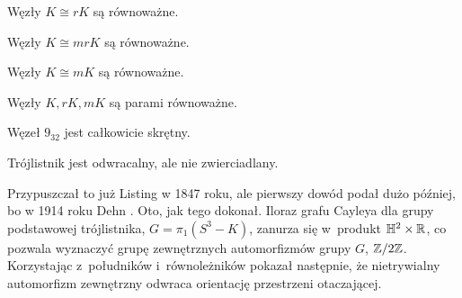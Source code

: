 \begin{definition}[odwracalny]
    Węzły $K \cong rK$ są równoważne. %
\end{definition}

\begin{definition}
    Węzły $K \cong mrK$ są równoważne. %
\end{definition}

\begin{definition}
    Węzły $K \cong mK$ są równoważne. %
\end{definition}

\begin{definition}
    Węzły $K, rK, mK$ są parami równoważne. %
\end{definition}

\begin{example}
    Węzeł $9_{32}$ jest całkowicie skrętny.
\end{example}


\begin{example}
    \label{exm:trefoil_is_chiral}
    Trójlistnik jest odwracalny, ale nie zwierciadlany.
\end{example}

Przypuszczał to już Listing \cite{listing1847} w 1847 roku, ale pierwszy dowód podał dużo później, bo w 1914 roku Dehn \cite{dehn1914}. 
Oto, jak tego dokonał.
Iloraz grafu Cayleya dla grupy podstawowej trójlistnika, $G = \pi_1(S^3 - K)$, zanurza się w~produkt $\mathbb H^2 \times \mathbb R$, co pozwala wyznaczyć grupę zewnętrznych automorfizmów grupy $G$, $\mathbb Z/2\mathbb Z$.
Korzystając z~południków i~równoleżników pokazał następnie, że nietrywialny automorfizm zewnętrzny odwraca orientację przestrzeni otaczającej.

